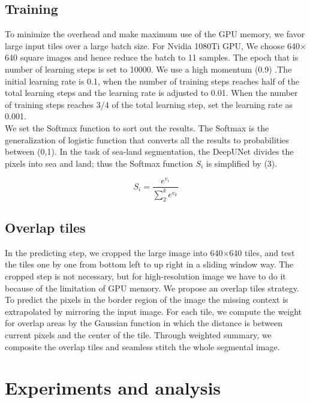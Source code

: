 \documentclass[conference]{IEEEtran}
\begin{document}
\subsection{Training}

To minimize the overhead and make maximum use of the GPU memory, we favor large input tiles over a large batch size.  For Nvidia 1080Ti GPU, We choose 640$\times$640 square images and hence reduce the batch to 11 samples. The epoch that is number of learning steps is set to 10000. We use a high momentum (0.9) .The initial learning rate is 0.1, when the number of training steps reaches half of the total learning steps and the learning rate is adjusted to 0.01. When the number of training steps reaches 3/4 of the total learning step, set the learning rate as 0.001.\\

We set the Softmax function to sort out the results. The Softmax is the generalization of logistic function that converts all the results to probabilities between (0,1). In the task of sea-land segmentation, the DeepUNet divides the pixels into sea and land; thus the Softmax function $S_{i}$ is simplified by (3).

\begin{equation}
S_{i}=\frac{e^{v_{i}}}{\sum^k_{2} e^{v_{k}}}
\end{equation}

\subsection{Overlap tiles}

In the predicting step, we cropped the large image into  640$\times$640  tiles, and test the tiles one by one from bottom left to up right in a sliding window way.  The cropped step is not  necessary, but for high-resolution image we have to do it because of the limitation of GPU memory. We propose an overlap tiles strategy.  To predict the pixels in the border region of the image the missing context is extrapolated by mirroring the input image. For each tile, we compute the weight for overlap areas by the Gaussian function in which the distance is between current pixels and the center of the tile. Through weighted summary, we composite the overlap tiles and seamless  stitch the whole segmental image.

\section{Experiments and analysis}
\end{document}
